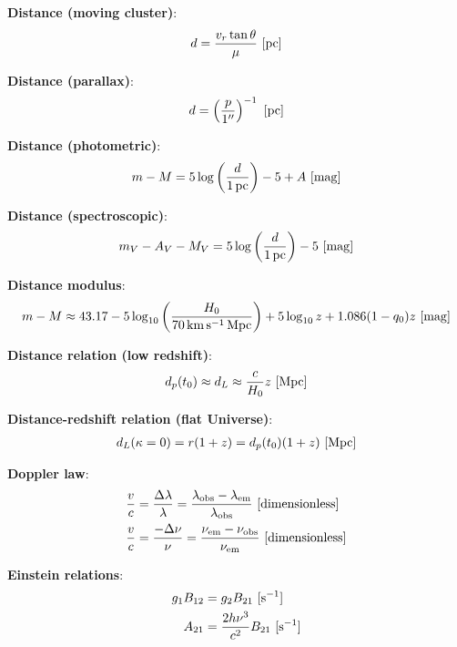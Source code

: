 \documentclass[a4paper,11pt]{article}
\begin{document}
{\noindent}\textbf{Distance (moving cluster)}:
\begin{align*}
    d = \frac{v_r\tan\theta}{\mu} ~ [{\rm pc}]
\end{align*}

{\noindent}\textbf{Distance (parallax)}:
\begin{align*}
    d = \left(\frac{p}{1''}\right)^{-1} ~ {[\rm pc]}
\end{align*}

{\noindent}\textbf{Distance (photometric)}:
\begin{align*}
    m-M = 5\log\left(\frac{d}{1\,{\rm pc}}\right)-5+A ~ [{\rm mag}]
\end{align*}

{\noindent}\textbf{Distance (spectroscopic)}:
\begin{align*}
    m_V-A_V-M_V = 5\log\left(\frac{d}{1\,{\rm pc}}\right)-5 ~ [{\rm mag}]
\end{align*}

{\noindent}\textbf{Distance modulus}:
\begin{align*}
    m - M \approx 43.17 - 5\log_{10} \left(\frac{H_0}{70\,{\rm km\,s^{-1}\,Mpc}}\right) + 5\log_{10}z + 1.086(1-q_0)z ~ [{\rm mag}]
\end{align*}

{\noindent}\textbf{Distance relation (low redshift)}:
\begin{align*}
    d_p(t_0) \approx d_L \approx \frac{c}{H_0}z ~ [{\rm Mpc}]
\end{align*}

{\noindent}\textbf{Distance-redshift relation (flat Universe)}:
\begin{align*}
    d_L(\kappa=0) = r(1+z) = d_p(t_0)(1+z) ~ [{\rm Mpc}]
\end{align*}

{\noindent}\textbf{Doppler law}:
\begin{align*}
    \frac{v}{c} &= \frac{\Delta\lambda}{\lambda} =  \frac{\lambda_\mathrm{obs}-\lambda_\mathrm{em}}{\lambda_\mathrm{obs}} ~ [{\rm dimensionless}] \\
    \frac{v}{c} &= \frac{-\Delta\nu}{\nu} =  \frac{\nu_\mathrm{em}-\nu_\mathrm{obs}}{\nu_\mathrm{em}} ~ [{\rm dimensionless}]
\end{align*}

{\noindent}\textbf{Einstein relations}:
\begin{align*}
    g_1B_{12} &= g_2B_{21} ~ [{\rm s^{-1}}] \\
    A_{21}    &= \frac{2h\nu^3}{c^2}B_{21}  ~ [{\rm s^{-1}}]
\end{align*}
\end{document}
